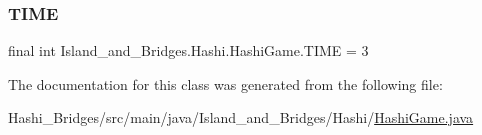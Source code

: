 \subsubsection{\texorpdfstring{T\+I\+ME}{TIME}}
{\footnotesize\ttfamily final int Island\+\_\+and\+\_\+\+Bridges.\+Hashi.\+Hashi\+Game.\+T\+I\+ME = 3\hspace{0.3cm}{\ttfamily [static]}}



The documentation for this class was generated from the following file\+:\begin{DoxyCompactItemize}
\item 
Hashi\+\_\+\+Bridges/src/main/java/\+Island\+\_\+and\+\_\+\+Bridges/\+Hashi/\mbox{\hyperlink{_hashi_game_8java}{Hashi\+Game.\+java}}\end{DoxyCompactItemize}
